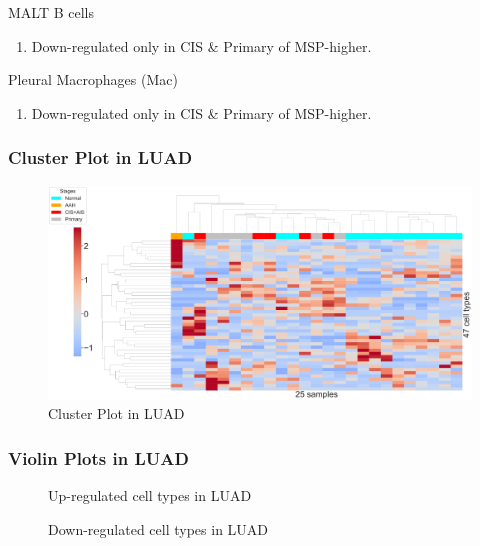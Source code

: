 \documentclass{beamer}
\begin{document}
\begin{frame}[allowframebreaks]
        \begin{block}{MALT B cells}
            \begin{enumerate}
                \item Down-regulated only in CIS \& Primary of MSP-higher.
            \end{enumerate}
        \end{block}

        \begin{block}{Pleural Macrophages (Mac)}
            \begin{enumerate}
                \item Down-regulated only in CIS \& Primary of MSP-higher.
            \end{enumerate}
        \end{block}
    \end{frame}

    \begin{frame}
        \frametitle{Cluster Plot in LUAD}

        \begin{figure}
            \includegraphics[width=0.9 \linewidth]{figures/BisqueRNA/clustermap/STAR.FPKM.GSE131907.ADC.pdf}
            \caption{Cluster Plot in LUAD}
        \end{figure}
    \end{frame}

    \begin{frame}[allowframebreaks]
        \frametitle{Violin Plots in LUAD}

        \begin{figure}
            \caption{Up-regulated cell types in LUAD}
        \end{figure}

        \begin{figure}
            \caption{Down-regulated cell types in LUAD}
        \end{figure}
    \end{frame}
\end{document}
